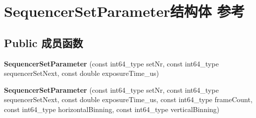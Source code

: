 \hypertarget{struct_sequencer_set_parameter}{\section{Sequencer\+Set\+Parameter结构体 参考}
\label{struct_sequencer_set_parameter}
}
\subsection*{Public 成员函数}
\begin{DoxyCompactItemize}
\item 
\hypertarget{struct_sequencer_set_parameter_a4dcdc08dd4c4cf9ec55d28575c8aecf4}{{\bfseries Sequencer\+Set\+Parameter} (const int64\+\_\+type set\+Nr, const int64\+\_\+type sequencer\+Set\+Next, const double exposure\+Time\+\_\+us)}\label{struct_sequencer_set_parameter_a4dcdc08dd4c4cf9ec55d28575c8aecf4}

\item 
\hypertarget{struct_sequencer_set_parameter_a19d183a6b23b71c6d971275f1cffc881}{{\bfseries Sequencer\+Set\+Parameter} (const int64\+\_\+type set\+Nr, const int64\+\_\+type sequencer\+Set\+Next, const double exposure\+Time\+\_\+us, const int64\+\_\+type frame\+Count, const int64\+\_\+type horizontal\+Binning, const int64\+\_\+type vertical\+Binning)}\label{struct_sequencer_set_parameter_a19d183a6b23b71c6d971275f1cffc881}

\end{DoxyCompactItemize}
